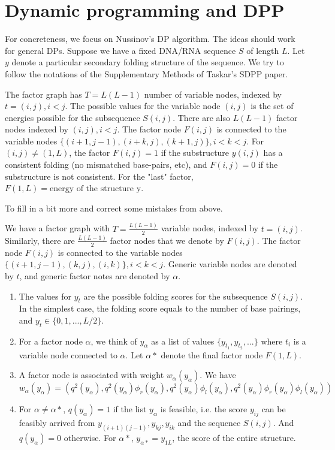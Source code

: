 \documentclass[idxtotoc,hyperref,openany]{labbook} %
\begin{document}

\section{Dynamic programming and DPP}
For concreteness, we focus on Nussinov's DP algorithm. The ideas should work for general DPs.  Suppose we have a fixed DNA/RNA sequence $S$ of length $L$. Let $y$ denote a particular secondary folding structure of the sequence. We try to follow the notations of the Supplementary Methods of Taskar's SDPP paper. 

The factor graph has $T=L(L-1)$ number of variable nodes, indexed by $t=(i,j), i<j$. The possible values for the variable node $(i,j)$ is the set of energies possible for the subsequence $S(i,j)$. There are also $L(L-1)$ factor nodes indexed by $(i,j), i<j$. The factor node $F(i,j)$ is connected to the variable nodes $\{(i+1, j-1), (i+k,j), (k+1, j)\}, i<k<j $. For $(i,j) \neq (1, L)$, the factor $F(i,j) = 1$ if the substructure $y(i,j)$ has a consistent folding (no mismatched base-pairs, etc), and $F(i,j)=0$ if the substructure is not consistent. For the "last" factor, $F(1,L)=\mbox{energy of the structure y}$.


To fill in a bit more and correct some mistakes from above.

We have a factor graph with $T=\frac{L(L-1)}{2}$ variable nodes, indexed by $t=(i,j)$. Similarly, there are $\frac{L(L-1)}{2}$ factor nodes that we denote by $F(i,j)$. The factor node  $F(i,j)$ is connected to the variable nodes $\{(i+1, j-1), (k,j), (i,k)\}, i<k<j $.  Generic variable nodes are denoted by $t$, and generic factor notes are denoted by $\alpha$. 

\begin{enumerate}
\item The values for $y_t$ are the possible folding scores for the subsequence $S(i,j)$. In the simplest case, the folding score equals to the number of base pairings, and $y_t \in \{0, 1, ..., L/2\}$.
\item For a factor node $\alpha$, we think of $y_{\alpha}$ as a list of values $\{y_{t_1}, y_{t_2}, ...\}$ where $t_i$ is a variable node connected to $\alpha$. Let $\alpha*$ denote the final factor node $F(1,L)$.
\item A factor node is associated with weight $w_{\alpha}(y_{\alpha})$. We have 
\[
w_{\alpha}(y_{\alpha})=(q^2(y_{\alpha}), q^2(y_{\alpha})\phi_r(y_{\alpha}), q^2(y_{\alpha})\phi_l(y_{\alpha}), q^2(y_{\alpha})\phi_r(y_{\alpha})\phi_l(y_{\alpha}) )
\]
\item For $\alpha \neq \alpha*$, $q(y_{\alpha})=1$ if the list $y_{\alpha}$ is feasible, i.e. the score $y_{ij}$ can be feasibly arrived from $y_{(i+1)(j-1)}, y_{kj}, y_{ik}$ and the sequence $S(i,j)$. And $q(y_{\alpha})=0$ otherwise. For $\alpha*$, $y_{\alpha*}=y_{1L}$, the score of the entire structure. 
\end{enumerate}
\end{document}
